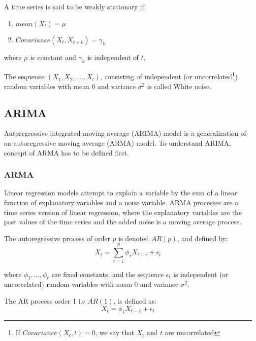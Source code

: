 \begin{definition}{}
A time series is said to be weakly stationary\cite{timeseriesdefinition} if:
\begin{enumerate}
  \item \(mean(X_{t}) = \mu\)
  \item \(Covariance( X_{t},X_{t+k}) = \gamma_{k} \)
\end{enumerate}
where \(\mu\) is constant and \(\gamma_{k}\) is independent of \(t\).
\end{definition}
\begin{definition}{}
The sequence \((X_{1},X_{2},....,X_{t})\), consisting of independent (or uncorrelated\footnote{If \(Covariance(X_{t}, t ) = 0\), we say that \(X_{t}\) and \(t\) are uncorrelated}) random variables with mean 0 and variance \(\sigma^2\) is called White noise.
\end{definition}

\subsection{ARIMA}
\label{sub:ARIMA}
 Autoregressive integrated moving average (ARIMA)\cite{box2015time} model is a generalization of an autoregressive moving average (ARMA)\cite{whitle1951hypothesis} model. To understand ARIMA, concept of ARMA has to be defined first.
\subsubsection{ARMA}
\label{subs:ARMA}
Linear regression models attempt to explain a variable by the sum of a linear function of explanatory variables and a noise variable. ARMA processes are a time series version of linear regression, where the explanatory variables are the past values of the time series and the added noise is a moving average process.

The autoregressive process of order \(p\) is denoted \(AR(p)\), and defined by\cite{timeseriesdefinition}:
\begin{equation}
  X_{t} = \sum_{r=1}^{p} \phi_{r} X_{t-r} + \epsilon_{t}
\end{equation}

where \(\phi_{1},...,\phi_{r}\) are fixed constants, and the sequence \(\epsilon_{t}\) is  independent (or uncorrelated) random variables with mean 0 and variance \(\sigma^2\).

The AR process order 1 i.e \(AR(1)\), is defined as\cite{timeseriesdefinition}:
\begin{equation}
  X_{t} = \phi_{1} X_{t-1} + \epsilon_{t}
\end{equation}


